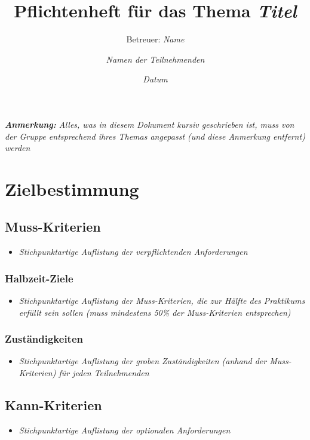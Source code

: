 \documentclass[a4paper,10pt]{scrartcl}
\title{Pflichtenheft für das Thema \glqq\textit{Titel}\grqq}
\subtitle{Betreuer: \textit{Name}}
\author{\textit{Namen der Teilnehmenden}}
\date{\textit{Datum}}
\begin{document}
\maketitle

\textit{\textbf{Anmerkung:} Alles, was in diesem Dokument kursiv geschrieben ist, muss von der Gruppe entsprechend ihres Themas angepasst (und diese Anmerkung entfernt) werden}

\section{Zielbestimmung}

\subsection{Muss-Kriterien}

\begin{itemize}
    \item \textit{Stichpunktartige Auflistung der verpflichtenden Anforderungen}
\end{itemize}

\subsubsection{Halbzeit-Ziele}
\begin{itemize}
    \item \textit{Stichpunktartige Auflistung der Muss-Kriterien, die zur Hälfte des Praktikums erfüllt sein sollen (muss mindestens 50\% der Muss-Kriterien entsprechen)}
\end{itemize}

\subsubsection{Zuständigkeiten}
\begin{itemize}
    \item \textit{Stichpunktartige Auflistung der groben Zuständigkeiten (anhand der Muss-Kriterien) für jeden Teilnehmenden}
\end{itemize}

\subsection{Kann-Kriterien}

\begin{itemize}
    \item \textit{Stichpunktartige Auflistung der optionalen Anforderungen}
\end{itemize}
\end{document}
